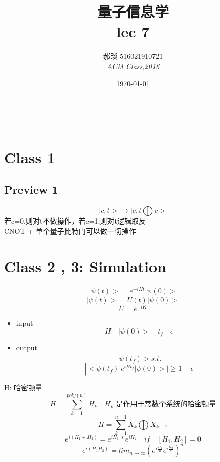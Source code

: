 \documentclass[a4paper, 11pt]{article} %
\title{\textbf{量子信息学}\\ %
lec 7} %
\author{\textsc{郝琰 516021910721} %
\\{\textit{ACM Class,2016}}} %
\date{\today} %
\makeatletter
\renewcommand{\maketitle}{ %

\begin{flushright} %
{\LARGE\@title} %

\vspace{50pt} %

{\large\@author} %
\\\@date %

\vspace{10pt} %
\end{flushright}
}
\makeatother
\begin{document}
\maketitle
\section{Class 1}
\subsection{Preview 1}
$$
|c,t> \rightarrow |c,t\bigoplus c>
$$
若c=0,则对t不做操作，若c=1,则对t逻辑取反\\
CNOT + 单个量子比特门可以做一切操作
\section{Class 2 , 3: Simulation}
$$
|\psi(t)> = e^{-iHt}|\psi(0)>
$$
$$
|\psi(t)> = U(t)|\psi(0)>
$$
$$
U = e^{-iK}
$$
\begin{itemize}
	\item
	input
	$$
	H\quad |\psi (0)> \quad t_f \quad \epsilon
	$$
	\item
	output
	$$
	|\tilde{\psi}(t_f)> s.t.
	$$
	$$
	|<\tilde{\psi}(t_f)|e^{iHt_f}|\psi(0)>| \geq 1-\epsilon
	$$
\end{itemize}

H: 哈密顿量
$$
H = \sum_{k=1}^{poly(n)} H_k \quad \mbox{$H_k$ 是作用于常数个系统的哈密顿量}
$$
$$
H = \sum_{k = 1}^{n-1} X_k \bigoplus X_{k+1}
$$
$$
e^{i(H_1+H_2)} = e^{iH_1}*e^{iH_2} \quad if \quad [H_1,H_2] = 0
$$
$$
e^{i(H_1H_2)} = lim_{n \rightarrow \infty}(e^{i\frac{H_1}{n}}e^{i\frac{H_2}{n}})^n
$$
\end{document}
